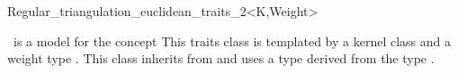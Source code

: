 

\begin{ccRefClass}{Regular_triangulation_euclidean_traits_2<K,Weight>}  %

\ccDefinition
  

 \ccRefName\  is a  model for the concept 
This traits class is templated by a kernel class 
and a weight type .
This class inherits from 
and uses a  type
derived from the type .


\ccIsModel
{}

\ccInheritsFrom
{}


\ccSeeAlso
{}\\
\\


\end{ccRefClass}



